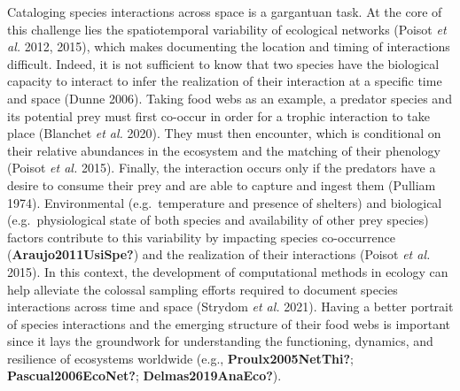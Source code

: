 \documentclass[10pt,oneside]{article}
\begin{document}
Cataloging species interactions across space is a gargantuan task. At
the core of this challenge lies the spatiotemporal variability of
ecological networks (Poisot \emph{et al.} 2012, 2015), which makes
documenting the location and timing of interactions difficult. Indeed,
it is not sufficient to know that two species have the biological
capacity to interact to infer the realization of their interaction at a
specific time and space (Dunne 2006). Taking food webs as an example, a
predator species and its potential prey must first co-occur in order for
a trophic interaction to take place (Blanchet \emph{et al.} 2020). They
must then encounter, which is conditional on their relative abundances
in the ecosystem and the matching of their phenology (Poisot \emph{et
al.} 2015). Finally, the interaction occurs only if the predators have a
desire to consume their prey and are able to capture and ingest them
(Pulliam 1974). Environmental (e.g.~temperature and presence of
shelters) and biological (e.g.~physiological state of both species and
availability of other prey species) factors contribute to this
variability by impacting species co-occurrence
(\textbf{Araujo2011UsiSpe?}) and the realization of their interactions
(Poisot \emph{et al.} 2015). In this context, the development of
computational methods in ecology can help alleviate the colossal
sampling efforts required to document species interactions across time
and space (Strydom \emph{et al.} 2021). Having a better portrait of
species interactions and the emerging structure of their food webs is
important since it lays the groundwork for understanding the
functioning, dynamics, and resilience of ecosystems worldwide (e.g.,
\textbf{Proulx2005NetThi?}; \textbf{Pascual2006EcoNet?};
\textbf{Delmas2019AnaEco?}).
\end{document}
